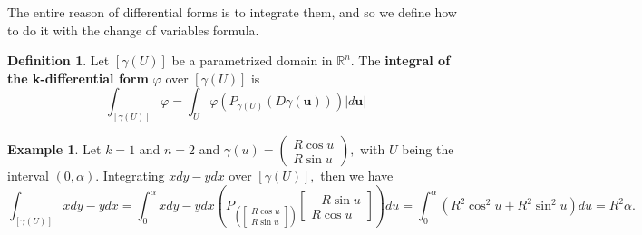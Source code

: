 \documentclass[10pt, oneside]{article}
\newcommand{\bbR}{\mathbb{R}}
\theoremstyle{definition}
\newtheorem{exmp}{Example}[section]
\newtheorem{defn}{Definition}
\begin{document}
The entire reason of differential forms is to integrate them, and so we define how to do it with the change of variables formula.
\begin{defn}
    Let $[\gamma(U)]$ be a parametrized domain in $\bbR^n.$ The \textbf{integral of the k-differential form} $\varphi$ over $[\gamma(U)]$ is 
    \[\int_{[\gamma(U)]}\varphi = \int_U \varphi\left(P_{\gamma(U)} \left(D\gamma(\textbf{u})\right)\right) |d\textbf{u}|\]
\end{defn}
\begin{exmp}
    Let $k=1$ and $n=2$ and $\gamma(u) = \begin{pmatrix}
        R\cos u\\
        R\sin u
    \end{pmatrix},$ with $U$ being the interval $(0,\alpha).$ Integrating $xdy - ydx$ over $[\gamma(U)],$ then we have 
    \[\int_{[\gamma(U)]}xdy - ydx = \int_0^\alpha xdy - ydx\left(P_{\left(\begin{bmatrix}
        R\cos u\\
        R\sin u
    \end{bmatrix}\right)} \begin{bmatrix}
        -R\sin u\\
        R\cos u
    \end{bmatrix}\right)du = \int_0^\alpha (R^2\cos^2u + R^2\sin^2 u)du = R^2\alpha.\]
\end{exmp}
\end{document}
